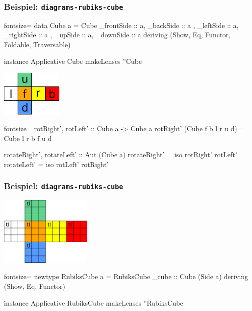 \documentclass{beamer}
\begin{document}
\begin{frame}[fragile]
  \frametitle{Beispiel: \texttt{diagrams-rubiks-cube}}
  \begin{haskellcode*}{fontsize=\small}
data Cube a = Cube
  { _frontSide :: a,  _backSide :: a
  ,  _leftSide :: a, _rightSide :: a
  ,    _upSide :: a,  _downSide :: a
  } deriving (Show, Eq, Functor, Foldable, Traversable)

instance Applicative Cube
makeLenses ''Cube


  \end{haskellcode*}
  \begin{minipage}{0.3 \linewidth}
    \includegraphics[width=3cm]{images/cube.png}
  \end{minipage}
  \begin{minipage}{0.67 \linewidth}
    \begin{haskellcode*}{fontsize=\small}
rotRight', rotLeft' :: Cube a -> Cube a
rotRight' (Cube f b l r u d) =
           Cube l r b f u d

rotateRight', rotateLeft' :: Aut (Cube a)
rotateRight' = iso rotRight' rotLeft'
rotateLeft'  = iso rotLeft'  rotRight'
    \end{haskellcode*}
  \end{minipage}
\end{frame}

\begin{frame}[fragile]
  \frametitle{Beispiel: \texttt{diagrams-rubiks-cube}}
  \begin{minipage}{0.43 \linewidth}
    \includegraphics[width=4.5cm]{images/rubikscube.png}
  \end{minipage}
  \begin{minipage}[b]{0.55 \linewidth}
    \begin{haskellcode*}{fontsize=\small}
newtype RubiksCube a = RubiksCube
  { _cube :: Cube (Side a) }
    deriving (Show, Eq, Functor)

instance Applicative RubiksCube
makeLenses ''RubiksCube
    \end{haskellcode*}
  \end{minipage}
\end{frame}
\end{document}
